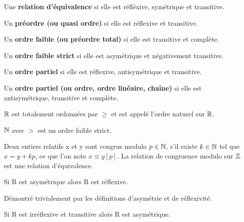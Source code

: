 \documentclass[a4paper, 12pt]{article}
\begin{document}
\begin{definition}
\item Une \textbf{relation d'équivalence} si elle est réfléxive, symétrique et transitive.
\item Un \textbf{préordre (ou quasi ordre)} si elle est réflexive et transitive.
\item Un \textbf{ordre faible (ou préordre total)} si elle est transitive et complète.
\item Un \textbf{ordre faible strict} si elle est asymétrique et négativement transitive.
\item Un \textbf{ordre partiel} si elle est réflexive, antisymétrique et transitive.
\item Un \textbf{ordre partiel (ou ordre, ordre linéaire, chaîne)} si elle est antisymétrique, transitive et complète.
\end{definition}

\begin{example}
\item $\mathbb{R}$ est totalement ordonnées par $\geq$ et est appelé l'ordre naturel sur $\mathbb{R}$.
\item $\mathbb{N}$ avec $\gt$ est un ordre faible strict.
\item Deux entiers relatifs x et y sont congrus modulo $p \in \mathbb{N}$, s'il existe $k \in \mathbb{N}$ tel que $x = y + kp$, ce que l'on note $x \equiv y[p]$.
    La relation de congruence modulo sur $\mathbb{Z}$ est une relation d'équivalence.
\end{example}




\begin{proposition}
    Si R est asymétrique alors R est réflexive.
\end{proposition}

\noindent
Démontré trivialement par les définitions d'asymétrie et de réflexivité.

\begin{proposition}
    Si R est irréflexive et transitive alors R est asymétrique.
\end{proposition}
\end{document}
